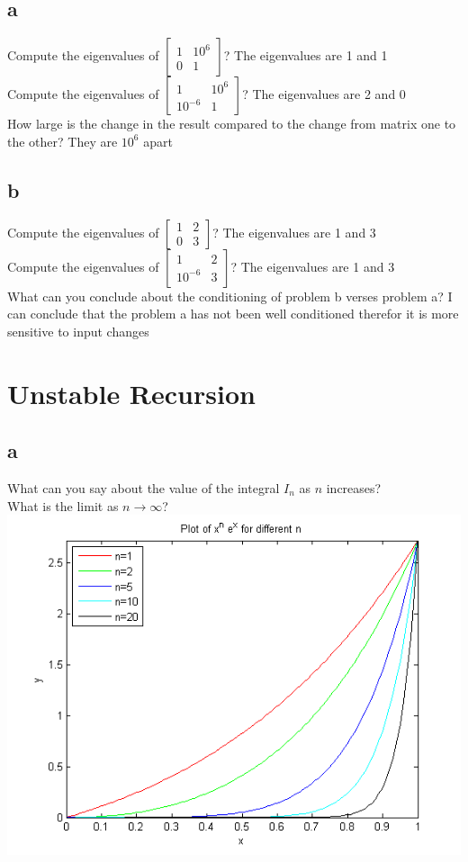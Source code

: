 \documentclass[letterpaper,12pt]{article}
\begin{document}
\subsection*{a}Compute the eigenvalues of 
$\begin{bmatrix}
 1 & 10^6 \\
  0 & 1 
\end{bmatrix}$? The eigenvalues are 1 and 1\\
Compute the eigenvalues of 
$\begin{bmatrix}
 1 & 10^6 \\
  10^{-6} & 1 
\end{bmatrix}$? The eigenvalues are 2 and 0\\
How large is the change in the result compared to the change from matrix one to the other? They are $10^6$ apart
\subsection*{b}Compute the eigenvalues of 
$\begin{bmatrix}
 1 & 2 \\
  0 & 3 
\end{bmatrix}$? The eigenvalues are 1 and 3\\
Compute the eigenvalues of 
$\begin{bmatrix}
 1 & 2 \\
  10^{-6} & 3 
\end{bmatrix}$? The eigenvalues are 1 and 3\\
What can you conclude about the conditioning of problem b verses problem a? I can conclude that the problem a has not been well conditioned therefor it is more sensitive to input changes

\newpage
\section{Unstable Recursion}
\subsection*{a}
What can you say about the value of the integral $I_n$ as $n$ increases?\\
What is the limit as $n\rightarrow\infty$?\\
\includegraphics[]{integralPlot.png}
\end{document}
